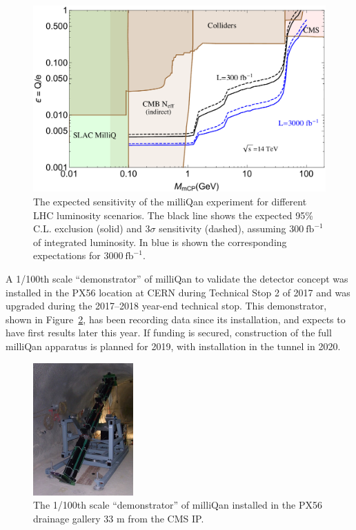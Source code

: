 \begin{figure}[h]
   \centering
   \includegraphics[width=0.9\linewidth]{figures/milliqan/exclusionplots_5b5.pdf}
   \caption{The expected sensitivity of the milliQan experiment for different LHC luminosity scenarios. The black line shows the expected 95\% C.L. exclusion (solid) and $3\sigma$ sensitivity (dashed), assuming $300~\text{fb}^{-1}$ of integrated luminosity. In blue is shown the corresponding expectations for $3000~\text{fb}^{-1}$.
\label{fig:abc}}
\end{figure}

A 1/100th scale ``demonstrator'' of milliQan to validate the detector concept was installed in the PX56 location at CERN during Technical Stop 2 of 2017 and was upgraded during the 2017--2018 year-end technical stop. This demonstrator, shown in Figure~\ref{fig:demo}, has been recording data since its installation, and expects to have first results later this year. If funding is secured, construction of the full milliQan apparatus is planned for 2019, with installation in the tunnel in 2020.

\begin{figure}[h]
   \centering
   \includegraphics[width=0.5\linewidth]{figures/milliqan/RIMG0141.pdf}
   \caption{The 1/100th scale ``demonstrator'' of milliQan installed in the PX56 drainage gallery 33 m from the CMS IP.
\label{fig:demo}}
\end{figure}

